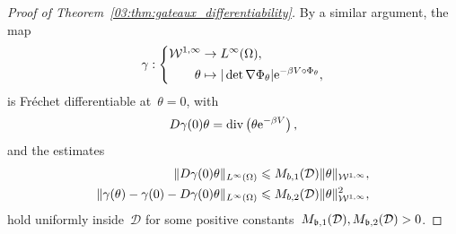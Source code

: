 \begin{proof}[Proof of Theorem~\ref{03:thm:gateaux_differentiability}]
    By a similar argument, the map
    \begin{equation}
        \label{03:eq:jacob_expr}
        \gamma:\left\{\begin{aligned}
            {\mathcal{W}}^{1,\infty}&\rightarrow L^\infty(\Omega),\\
            \theta & \mapsto |\det \nabla \Phi_\theta| \mathrm{e}^{-\beta V\circ \Phi_\theta},
        \end{aligned}\right.
    \end{equation}
    is Fréchet differentiable at~$\theta = 0$, with
    \begin{equation}
        D\gamma(0)\theta = \mathrm{div}\left(\theta\mathrm{e}^{-\beta V}\right),
    \end{equation}
    and the estimates
    \begin{equation}
        \label{03:eq:dgamma_estimates}
        \begin{aligned}
            \|D\gamma(0)\theta\|_{L^\infty(\Omega)} &\leqslant M_{b,1}(\mathcal D)\|\theta\|_{{\mathcal{W}}^{1,\infty}},\\
            \|\gamma(\theta)- \gamma(0)-D\gamma(0)\theta\|_{L^\infty(\Omega)} & \leqslant M_{b,2}(\mathcal D)\|\theta\|_{{\mathcal{W}}^{1,\infty}}^2,
        \end{aligned}
    \end{equation}
    hold uniformly inside~$\mathcal D$ for some positive constants~$M_{\mathfrak{b},1}(\mathcal D),M_{\mathfrak{b},2}(\mathcal D)>0$.


\end{proof}
